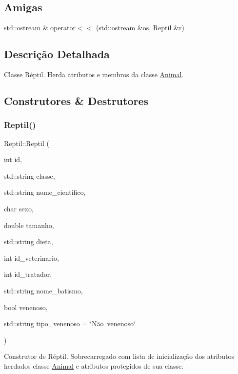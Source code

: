 \subsection*{Amigas}
\begin{DoxyCompactItemize}
\item 
std\+::ostream \& \hyperlink{classReptil_a9634321aa61220b56b433a92fd851bad}{operator$<$$<$} (std\+::ostream \&os, \hyperlink{classReptil}{Reptil} \&r)
\end{DoxyCompactItemize}


\subsection{Descrição Detalhada}
Classe Réptil. Herda atributos e membros da classe \hyperlink{classAnimal}{Animal}. 

\subsection{Construtores \& Destrutores}
\mbox{\label{classReptil_a7fcd4e6da06fcb4087101d0dc2d151d9}} 
\subsubsection{\texorpdfstring{Reptil()}{Reptil()}}
{\footnotesize\ttfamily Reptil\+::\+Reptil (\begin{DoxyParamCaption}\item[{int}]{id,  }\item[{std\+::string}]{classe,  }\item[{std\+::string}]{nome\+\_\+cientifico,  }\item[{char}]{sexo,  }\item[{double}]{tamanho,  }\item[{std\+::string}]{dieta,  }\item[{int}]{id\+\_\+veterinario,  }\item[{int}]{id\+\_\+tratador,  }\item[{std\+::string}]{nome\+\_\+batismo,  }\item[{bool}]{venenoso,  }\item[{std\+::string}]{tipo\+\_\+venenoso = {\ttfamily \char`\"{}Não~venenoso\char`\"{}} }\end{DoxyParamCaption})}

Construtor de Réptil. Sobrecarregado com lista de inicialização dos atributos herdados classe \hyperlink{classAnimal}{Animal} e atributos protegidos de sua classe. \mbox{\label{classReptil_a826ed679cc45f74fefecef7d4d40b409}} 
